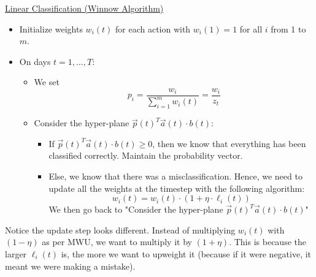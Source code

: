 \documentclass[11pt]{article}
\begin{document}
\begin{mdframed}[backgroundcolor=blue!05,topline=false,bottomline=false,leftline=false,rightline=false] 
	\underline{\sc Linear Classification (Winnow Algorithm)}
	\begin{itemize}
		\item Initialize weights $w_i(t)$ for each action with $w_i(1) = 1$ for all $i$ from 1 to $m$.
		\item On days $t=1,\ldots, T$:
		\begin{itemize}
			\item We set $$p_i = \frac{w_i}{\sum_{i=1}^m w_i(t)} = \frac{w_i}{z_t}$$
			\item Consider the hyper-plane $\vec{p}(t) ^T \vec{a}(t) \cdot b(t)$:
			\begin{itemize}
			    \item If $\vec{p}(t) ^T \vec{a}(t) \cdot b(t) \geq 0$, then we know that everything has been classified correctly. Maintain the probability vector.
			    \item Else, we know that there was a misclassification. Hence, we need to update all the weights at the timestep with the following algorithm: 
			    \begin{equation}
			    \label{eq:halving}
			    w_i(t) = w_i(t) \cdot (1 + \eta \cdot \ell_i(t)) \nonumber
			    \end{equation}
			    We then go back to "Consider the hyper-plane $\vec{p}(t) ^T \vec{a}(t) \cdot b(t)$"
			\end{itemize}
			
		\end{itemize} 
	\end{itemize}
\end{mdframed}

Notice the update step looks different. Instead of multiplying $w_i(t)$ with $(1-\eta)$ as per MWU, we want to multiply it by $(1+\eta)$. This is because the larger $\ell_i(t)$ is, the more we want to upweight it (because if it were negative, it meant we were making a mistake). 
\end{document}
